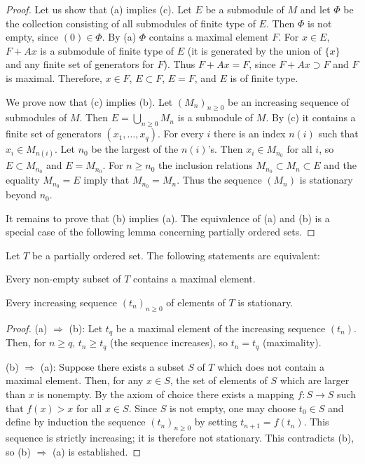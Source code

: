 \begin{proof}
Let us show that (a) implies (c). Let $E$ be a submodule of $M$ and let
$\Phi$ be the collection consisting of all submodules of finite type of $E$.
Then $\Phi$ is not empty, since $(0)\in\Phi$. By (a) $\Phi$ contains a
maximal element $F$. For $x\in E$, $F+Ax$ is a submodule of finite type of
$E$ (it is generated by the union of $\{x\}$ and any finite set of
generators for $F$). Thus $F+Ax=F$, since $F+Ax\supset F$ and $F$ is
maximal. Therefore, $x\in F$, $E\subset F$, $E=F$, and $E$ is of finite
type.

We prove now that (c) implies (b). Let $(M_{n})_{n\geq0}$ be an increasing
sequence of submodules of $M$. Then $E=\bigcup_{n\geq0}M_{n}$ is a
submodule of $M$. By (c) it contains a finite set of generators
$(x_{1},\ldots,x_{q})$. For every $i$ there is an index $n(i)$ such that
$x_{i}\in M_{n(i)}$. Let $n_{0}$ be the largest of the $n(i)$'s. Then
$x_{i}\in M_{n_{0}}$ for all $i$, so $E\subset M_{n_{0}}$ and
$E=M_{n_{0}}$. For $n\geq n_{0}$ the inclusion relations
$M_{n_{0}}\subset M_{n}\subset E$ and the equality $M_{n_{0}}=E$ imply that
$M_{n_{0}}=M_{n}$. Thus the sequence $(M_{n})$ is stationary beyond $n_{0}$.

It remains to prove that (b) implies (a). The equivalence of (a) and (b) is
a special case of the following lemma concerning partially ordered sets.
\end{proof}

\begin{lemma}
\label{lem:I.4.1}
Let $T$ be a partially ordered set. The following statements are equivalent:
\begin{alist}
\item Every non-empty subset of $T$ contains a maximal element.
\item Every increasing sequence $(t_{n})_{n\geq0}$ of elements of $T$ is
stationary.
\end{alist}
\end{lemma}

\begin{proof}
(a) $\Rightarrow$ (b): Let $t_{q}$ be a maximal element of the increasing
sequence $(t_{n})$. Then, for $n\geq q$, $t_{n}\geq t_{q}$ (the sequence
increases), so $t_{n}=t_{q}$ (maximality).

(b) $\Rightarrow$ (a): Suppose there exists a subset $S$ of $T$ which does
not contain a maximal element. Then, for any $x\in S$, the set of elements
of $S$ which are larger than $x$ is nonempty. By the axiom of choice there
exists a mapping $f:S\to S$ such that $f(x)>x$ for all $x\in S$. Since $S$
is not empty, one may choose $t_{0}\in S$ and define by induction the
sequence $(t_{n})_{n\geq0}$ by setting $t_{n+1}=f(t_{n})$. This sequence is
strictly increasing; it is therefore not stationary. This contradicts (b),
so (b) $\Rightarrow$ (a) is established.
\end{proof}

